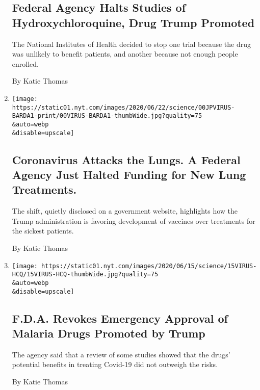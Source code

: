 \begin{enumerate}
  \hypertarget{federal-agency-halts-studies-of-hydroxychloroquine-drug-trump-promoted}{%
  \subsection{Federal Agency Halts Studies of Hydroxychloroquine, Drug
  Trump
  Promoted}\label{federal-agency-halts-studies-of-hydroxychloroquine-drug-trump-promoted}}

  The National Institutes of Health decided to stop one trial because
  the drug was unlikely to benefit patients, and another because not
  enough people enrolled.

  By Katie Thomas
\item
  \href{/2020/06/19/health/coronavirus-lung-treatment-funding.html}{}

  \texttt{[image: https://static01.nyt.com/images/2020/06/22/science/00JPVIRUS-BARDA1-print/00VIRUS-BARDA1-thumbWide.jpg?quality=75\\\&auto=webp\\\&disable=upscale]}

  \hypertarget{coronavirus-attacks-the-lungs-a-federal-agency-just-halted-funding-for-new-lung-treatments}{%
  \subsection{Coronavirus Attacks the Lungs. A Federal Agency Just
  Halted Funding for New Lung
  Treatments.}\label{coronavirus-attacks-the-lungs-a-federal-agency-just-halted-funding-for-new-lung-treatments}}

  The shift, quietly disclosed on a government website, highlights how
  the Trump administration is favoring development of vaccines over
  treatments for the sickest patients.

  By Katie Thomas
\item
  \href{/2020/06/15/health/fda-hydroxychloroquine-malaria.html}{}

  \texttt{[image: https://static01.nyt.com/images/2020/06/15/science/15VIRUS-HCQ/15VIRUS-HCQ-thumbWide.jpg?quality=75\\\&auto=webp\\\&disable=upscale]}

  \hypertarget{fda-revokes-emergency-approval-of-malaria-drugs-promoted-by-trump}{%
  \subsection{F.D.A. Revokes Emergency Approval of Malaria Drugs
  Promoted by
  Trump}\label{fda-revokes-emergency-approval-of-malaria-drugs-promoted-by-trump}}

  The agency said that a review of some studies showed that the drugs'
  potential benefits in treating Covid-19 did not outweigh the risks.

  By Katie Thomas
\end{enumerate}

